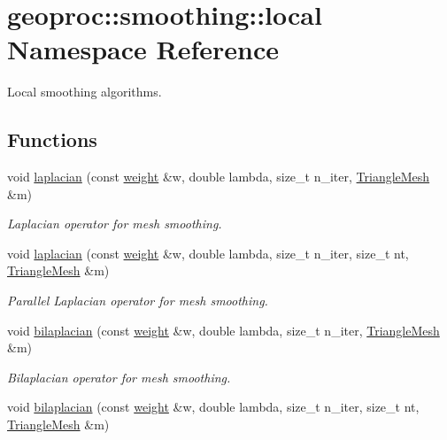 \hypertarget{namespacegeoproc_1_1smoothing_1_1local}{}\section{geoproc\+:\+:smoothing\+:\+:local Namespace Reference}
\label{namespacegeoproc_1_1smoothing_1_1local}


Local smoothing algorithms.  


\subsection*{Functions}
\begin{DoxyCompactItemize}
\item 
void \hyperlink{namespacegeoproc_1_1smoothing_1_1local_aca304df02cb346b9786b22fa3fb80c88}{laplacian} (const \hyperlink{namespacegeoproc_a12e5a10581b53b9dd9a509127527f843}{weight} \&w, double lambda, size\+\_\+t n\+\_\+iter, \hyperlink{classgeoproc_1_1TriangleMesh}{Triangle\+Mesh} \&m)
\begin{DoxyCompactList}\small\item\em Laplacian operator for mesh smoothing. \end{DoxyCompactList}\item 
void \hyperlink{namespacegeoproc_1_1smoothing_1_1local_aeb4e9f73796dce51c4dcac3c1e824fa7}{laplacian} (const \hyperlink{namespacegeoproc_a12e5a10581b53b9dd9a509127527f843}{weight} \&w, double lambda, size\+\_\+t n\+\_\+iter, size\+\_\+t nt, \hyperlink{classgeoproc_1_1TriangleMesh}{Triangle\+Mesh} \&m)
\begin{DoxyCompactList}\small\item\em Parallel Laplacian operator for mesh smoothing. \end{DoxyCompactList}\item 
void \hyperlink{namespacegeoproc_1_1smoothing_1_1local_ae414b9bd00610e2f63096ab8c087b5ea}{bilaplacian} (const \hyperlink{namespacegeoproc_a12e5a10581b53b9dd9a509127527f843}{weight} \&w, double lambda, size\+\_\+t n\+\_\+iter, \hyperlink{classgeoproc_1_1TriangleMesh}{Triangle\+Mesh} \&m)
\begin{DoxyCompactList}\small\item\em Bilaplacian operator for mesh smoothing. \end{DoxyCompactList}\item 
void \hyperlink{namespacegeoproc_1_1smoothing_1_1local_a57fc04667cb54871012f162f6af1deed}{bilaplacian} (const \hyperlink{namespacegeoproc_a12e5a10581b53b9dd9a509127527f843}{weight} \&w, double lambda, size\+\_\+t n\+\_\+iter, size\+\_\+t nt, \hyperlink{classgeoproc_1_1TriangleMesh}{Triangle\+Mesh} \&m)

\end{DoxyCompactItemize}
